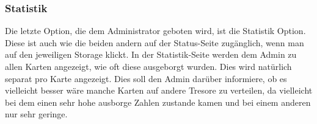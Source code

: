 \newpage

\subsubsection{Statistik} \label{subsubsec:stats}
Die letzte Option, die dem Administrator geboten wird, ist die Statistik Option. Diese ist auch wie die beiden andern auf der Status-Seite zugänglich, wenn man auf den jeweiligen Storage klickt. In der Statistik-Seite werden dem Admin zu allen Karten angezeigt, wie oft diese ausgeborgt wurden. Dies wird natürlich separat pro Karte angezeigt. Dies soll den Admin darüber informiere, ob es vielleicht besser wäre manche Karten auf andere Tresore zu verteilen, da vielleicht bei dem einen sehr hohe ausborge Zahlen zustande kamen und bei einem anderen nur sehr geringe.

